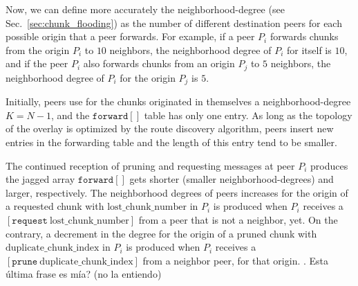 Now, we can define more accurately the \gls{neighborhood-degree} (see
Sec.~\ref{sec:chunk_flooding}) as the number of different destination
peers for each possible origin that a peer forwards. For example, if a
peer $P_i$ forwards chunks from the origin $P_i$ to $10$ neighbors, the
neighborhood degree of $P_i$ for itself is $10$, and if the
peer $P_i$ also forwards chunks from an origin $P_j$ to $5$ neighbors,
the neighborhood degree of $P_i$ for the origin $P_j$ is $5$.

Initially, peers use for the chunks originated in themselves a
\gls{neighborhood-degree} $K=N-1$, and the $\mathtt{forward}[]$ table
has only one entry. As long as the topology of the overlay is
optimized by the route discovery algorithm, peers insert new entries
in the forwarding table and the length of this entry tend to be
smaller.

The continued reception of pruning and requesting messages at peer
$P_i$ produces the jagged array $\mathtt{forward}[]$ gets shorter
(smaller \gls{neighborhood-degree}s) and larger, respectively. The
neighborhood degrees of peers increases for the origin of a requested
chunk with $\text{lost\_chunk\_number}$ in $P_i$ is produced when
$P_i$ receives a $[\mathtt{request}~\text{lost\_chunk\_number}]$ from
a peer that is not a neighbor, yet.  On the
contrary, a decrement in the degree for the origin of a pruned chunk
with $\text{duplicate\_chunk\_index}$ in $P_i$ is produced when $P_i$
receives a $[\mathtt{prune}~\text{duplicate\_chunk\_index}]$ from a
neighbor peer, for that origin. . {\color{red} Esta \'ultima frase es m\'ia? (no la entiendo)}
